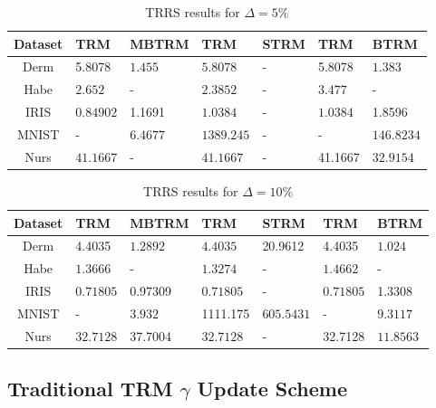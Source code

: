 \documentclass[letterpaper,12pt,titlepage,oneside,final]{book}
\begin{document}
\begin{table}[h] 
	\centering 
	\begin{tabular}{ |c||l|l||l|l||l|l| } 
		\hline 
		\textbf{Dataset} & \textbf{TRM} & \textbf{MBTRM} & \textbf{TRM} & \textbf{STRM} & \textbf{TRM} & \textbf{BTRM} \\ 
		\hline 
		\hline 
		Derm &5.8078 & $\mathbf{1.455}$ & $\mathbf{5.8078}$ & - &5.8078 & $\mathbf{1.383}$\\ 
		\hline 
		Habe & $\mathbf{2.652}$ & - & $\mathbf{2.3852}$ & - & $\mathbf{3.477}$ & -\\ 
		\hline 
		IRIS & $\mathbf{0.84902}$ &1.1691 & $\mathbf{1.0384}$ & - & $\mathbf{1.0384}$ &1.8596\\ 
		\hline 
		MNIST & - & $\mathbf{6.4677}$ & $\mathbf{1389.245}$ & - & - & $\mathbf{146.8234}$\\ 
		\hline 
		Nurs & $\mathbf{41.1667}$ & - & $\mathbf{41.1667}$ & - &41.1667 & $\mathbf{32.9154}$\\ 
		\hline 
	\end{tabular} 
	\caption{TRRS results for $\Delta = 5 \%$} \label{SMBTRMTRM5} \end{table}
	
\begin{table}[h] 
	\centering 
	\begin{tabular}{ |c||l|l||l|l||l|l| } 
		\hline 
		\textbf{Dataset} & \textbf{TRM} & \textbf{MBTRM} & \textbf{TRM} & \textbf{STRM} & \textbf{TRM} & \textbf{BTRM} \\ 
		\hline 
		\hline 
		Derm &4.4035 & $\mathbf{1.2892}$ & $\mathbf{4.4035}$ &20.9612 &4.4035 & $\mathbf{1.024}$\\ 
		\hline 
		Habe & $\mathbf{1.3666}$ & - & $\mathbf{1.3274}$ & - & $\mathbf{1.4662}$ & -\\ 
		\hline 
		IRIS & $\mathbf{0.71805}$ &0.97309 & $\mathbf{0.71805}$ & - & $\mathbf{0.71805}$ &1.3308\\ 
		\hline 
		MNIST & - & $\mathbf{3.932}$ &1111.175 & $\mathbf{605.5431}$ & - & $\mathbf{9.3117}$\\ 
		\hline 
		Nurs & $\mathbf{32.7128}$ &37.7004 & $\mathbf{32.7128}$ & - &32.7128 & $\mathbf{11.8563}$\\ 
		\hline 
	\end{tabular} 
	\caption{TRRS results for $\Delta = 10 \%$} \label{SMBTRMTRM10} \end{table}
	
	\subsection{Traditional TRM $\gamma$ Update Scheme}
	
\end{document}

